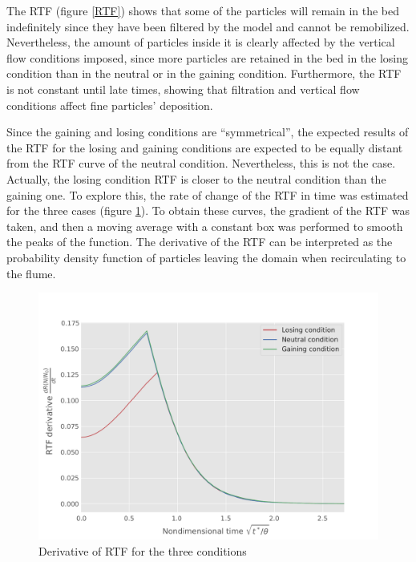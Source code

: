 \documentclass[draft,linenumbers]{agujournal2018}
\begin{document}
The RTF (figure \ref{RTF}) shows that some of the particles will remain in the bed indefinitely since they have been filtered by the model and cannot be remobilized. Nevertheless, the amount of particles inside it is clearly affected by the vertical flow conditions imposed, since more particles are retained in the bed in the losing condition than in the neutral or in the gaining condition. Furthermore, the RTF is not constant until late times, showing that filtration and vertical flow conditions affect fine particles' deposition.   

Since the gaining and losing conditions are ``symmetrical'', the expected results of the RTF for the losing and gaining conditions are expected to be equally distant from the RTF curve of the neutral condition. Nevertheless, this is not the case. Actually, the losing condition RTF is closer to the neutral condition than the gaining one. To explore this, the rate of change of the RTF in time was estimated for the three cases (figure \ref{RTFder}). To obtain these curves, the gradient of the RTF was taken, and then a moving average with a constant box was performed to smooth the peaks of the function. The derivative of the RTF can be interpreted as the probability density function of particles leaving the domain when recirculating to the flume.

\begin{figure}[ht]
\centering
\includegraphics[trim=0.2cm 0.2cm 0.2cm 0.2cm, width=35pc]
{190131_RTF_der.pdf}
\caption{Derivative of RTF for the three conditions}
\label{RTFder}
\end{figure}
\end{document}
